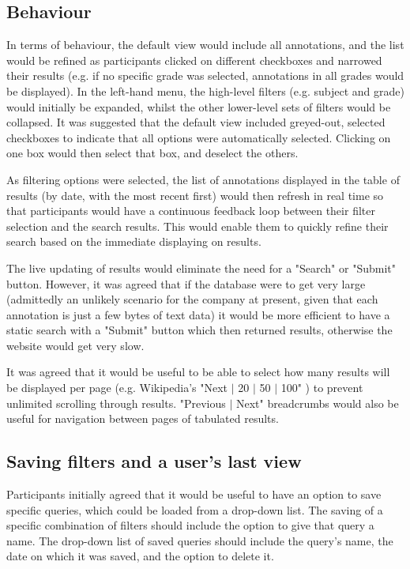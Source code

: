 \subsection{Behaviour}
In terms of behaviour,  the default view would include all annotations, and the list would be refined as participants clicked on different checkboxes and narrowed their results (e.g. if no specific grade was selected, annotations in all grades would be displayed). In the left-hand menu, the high-level filters (e.g. subject and grade) would initially be expanded, whilst the other lower-level sets of filters would be collapsed. It was suggested that the default view included greyed-out, selected checkboxes to indicate that all options were automatically selected. Clicking on one box would then select that box, and deselect the others. 

As filtering options were selected, the list of annotations displayed in the table of results (by date, with the most recent first) would then refresh in real time so that participants would have a continuous feedback loop between their filter selection and the search results. This would enable them to quickly refine their search based on the immediate displaying on results.

The live updating of results would eliminate the need for a "Search" or "Submit" button. However, it was agreed that if the database were to get very large (admittedly an unlikely scenario for the company at present, given that each annotation is just a few bytes of text data) it would be more efficient to have a static search with a "Submit" button which then returned results, otherwise the website would get very slow. 

It was agreed that it would be useful to be able to select how many results will be displayed per page (e.g. Wikipedia's "Next $\vert$ 20 $\vert$ 50 $\vert$ 100" \citep{Wikipedia}) to prevent unlimited scrolling through results. "Previous $\vert$ Next" breadcrumbs would also be useful for navigation between pages of tabulated results. 

\subsection{Saving filters and a user's last view}
Participants initially agreed that it would be useful to have an option to save specific queries, which could be loaded from a drop-down list. The saving of a specific combination of filters should include the option to give that query a name. The drop-down list of saved queries should include the query's name, the date on which it was saved, and the option to delete it.

